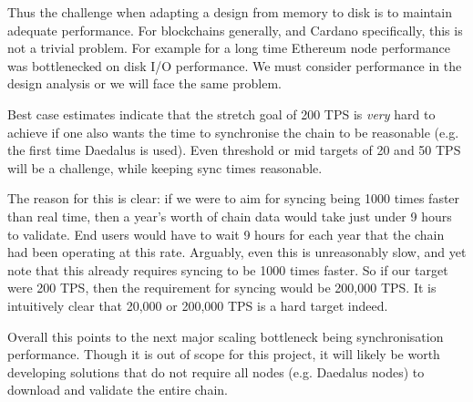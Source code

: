 \documentclass[11pt,a4paper]{article}
\begin{document}
Thus the challenge when adapting a design from memory to disk is to maintain
adequate performance. For blockchains generally, and Cardano specifically, this
is not a trivial problem. For example for a long time Ethereum node performance
was bottlenecked on disk I/O performance. We must consider performance in the
design analysis or we will face the same problem.

Best case estimates indicate that the stretch goal of 200 TPS is \emph{very}
hard to achieve if one also wants the time to synchronise the chain to be
reasonable (e.g. the first time Daedalus is used). Even threshold or mid
targets of 20 and 50 TPS will be a challenge, while keeping sync times
reasonable.

The reason for this is clear: if we were to aim for syncing being 1000 times
faster than real time, then a year's worth of chain data would take just under
9 hours to validate. End users would have to wait 9 hours for each year that
the chain had been operating at this rate. Arguably, even this is unreasonably
slow, and yet note that this already requires syncing to be 1000 times faster.
So if our target were 200 TPS, then the requirement for syncing would be
200,000 TPS. It is intuitively clear that 20,000 or 200,000 TPS is a hard
target indeed.

Overall this points to the next major scaling bottleneck being synchronisation
performance. Though it is out of scope for this project, it will likely be
worth developing solutions that do not require all nodes (e.g. Daedalus nodes)
to download and validate the entire chain.
\end{document}
